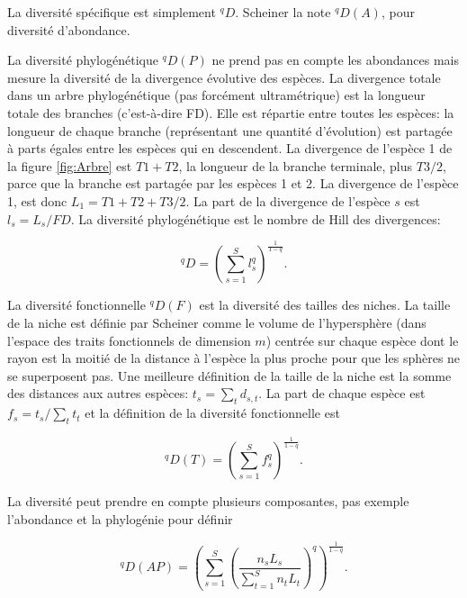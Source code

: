 \documentclass[
  11pt,
  french,
  a4paper,
  extrafontsizes,onecolumn,openright
  ]{memoir}
\begin{document}
La diversité spécifique est simplement \(^{q}\!D\). Scheiner la note \(^{q}\!D(A)\), pour diversité d'abondance.

La diversité phylogénétique \(^{q}\!D(P)\) ne prend pas en compte les abondances mais mesure la diversité de la divergence évolutive des espèces.
La divergence totale dans un arbre phylogénétique (pas forcément ultramétrique) est la longueur totale des branches (c'est-à-dire FD).
Elle est répartie entre toutes les espèces: la longueur de chaque branche (représentant une quantité d'évolution) est partagée à parts égales entre les espèces qui en descendent.
La divergence de l'espèce 1 de la figure \ref{fig:Arbre} est \(T1+T2\), la longueur de la branche terminale, plus \({T3}/{2}\), parce que la branche est partagée par les espèces 1 et 2.
La divergence de l'espèce 1, est donc \(L_1 = T1+T2+{T3}/{2}\).
La part de la divergence de l'espèce \(s\) est \(l_s = {L_s}/{FD}\).
La diversité phylogénétique est le nombre de Hill des divergences:

\begin{equation}
  \label{eq:HillDivergences}
  ^{q}\!D = {\left(\sum^S_{s=1}{l_s^q}\right)}^{\frac{1}{1-q}}.
\end{equation}

La diversité fonctionnelle \(^{q}\!D(F)\) est la diversité des tailles des niches. La taille de la niche est définie par Scheiner comme le volume de l'hypersphère (dans l'espace des traits fonctionnels de dimension \(m\)) centrée sur chaque espèce dont le rayon est la moitié de la distance à l'espèce la plus proche pour que les sphères ne se superposent pas.
Une meilleure définition \autocite{Presley2014} de la taille de la niche est la somme des distances aux autres espèces: \(t_s = \sum_t{d_{s,t}}\). La part de chaque espèce est \(f_s={t_s}/{\sum_t{t_t}}\) et la définition de la diversité fonctionnelle est

\begin{equation}
  \label{eq:DqT}
  ^{q}\!D(T) = {\left(\sum^S_{s=1}{f_s^q}\right)}^{\frac{1}{1-q}}.
\end{equation}

La diversité peut prendre en compte plusieurs composantes, pas exemple l'abondance et la phylogénie pour définir

\begin{equation}
  \label{eq:qDAP}
  ^{q}\!D(AP) = {\left(\sum^S_{s=1}{\left(\frac{n_s L_s}{\sum^S_{t=1}{n_t L_t}}\right)^q}\right)}^{\frac{1}{1-q}}.
\end{equation}
\end{document}
